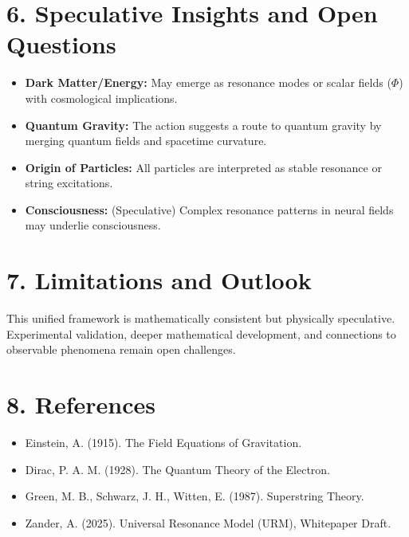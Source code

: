 \documentclass[12pt]{article}
\begin{document}
\section*{6. Speculative Insights and Open Questions}
\begin{itemize}
    \item \textbf{Dark Matter/Energy:} May emerge as resonance modes or scalar fields ($\Phi$) with cosmological implications.
    \item \textbf{Quantum Gravity:} The action suggests a route to quantum gravity by merging quantum fields and spacetime curvature.
    \item \textbf{Origin of Particles:} All particles are interpreted as stable resonance or string excitations.
    \item \textbf{Consciousness:} (Speculative) Complex resonance patterns in neural fields may underlie consciousness.
\end{itemize}

\section*{7. Limitations and Outlook}
This unified framework is mathematically consistent but physically speculative. Experimental validation, deeper mathematical development, and connections to observable phenomena remain open challenges.

\section*{8. References}
\begin{itemize}
    \item Einstein, A. (1915). The Field Equations of Gravitation.
    \item Dirac, P. A. M. (1928). The Quantum Theory of the Electron.
    \item Green, M. B., Schwarz, J. H., Witten, E. (1987). Superstring Theory.
    \item Zander, A. (2025). Universal Resonance Model (URM), Whitepaper Draft.
\end{itemize}

%
\end{document}
